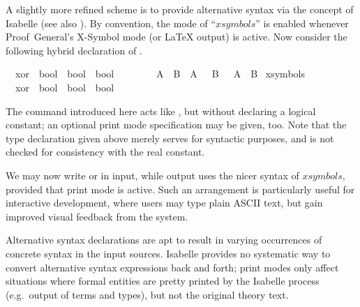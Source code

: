 \begin{isabellebody}
\begin{isamarkuptext}
  \medskip A slightly more refined scheme is to provide alternative
  syntax via the  concept of Isabelle (see also
  \cite{isabelle-ref}).  By convention, the mode of ``$xsymbols$'' is
  enabled whenever Proof~General's X-Symbol mode (or {\LaTeX} output)
  is active.  Now consider the following hybrid declaration of .%
\end{isamarkuptext}%
\isamarkuptrue%
\isamarkupfalse%
\isamarkupfalse%
\isanewline
\ \ xor\ {\isacharcolon}{\isacharcolon}\ {\isachardoublequote}bool\ {\isasymRightarrow}\ bool\ {\isasymRightarrow}\ bool{\isachardoublequote}\ \ \ \ {\isacharparenleft}\ {\isachardoublequote}{\isacharbrackleft}{\isacharplus}{\isacharbrackright}{\isasymignore}{\isachardoublequote}\ {}{}{\isacharparenright}\isanewline
\ \ {\isachardoublequote}A\ {\isacharbrackleft}{\isacharplus}{\isacharbrackright}{\isasymignore}\ B\ {\isasymequiv}\ {\isacharparenleft}A\ {\isasymand}\ {\isasymnot}\ B{\isacharparenright}\ {\isasymor}\ {\isacharparenleft}{\isasymnot}\ A\ {\isasymand}\ B{\isacharparenright}{\isachardoublequote}\isanewline
\isanewline
\isamarkupfalse%
\ {\isacharparenleft}xsymbols{\isacharparenright}\isanewline
\ \ xor\ {\isacharcolon}{\isacharcolon}\ {\isachardoublequote}bool\ {\isasymRightarrow}\ bool\ {\isasymRightarrow}\ bool{\isachardoublequote}\ \ \ \ {\isacharparenleft}\ {\isachardoublequote}{\isasymoplus}{\isasymignore}{\isachardoublequote}\ {}{}{\isacharparenright}\isamarkupfalse%
\isamarkupfalse%
%
\begin{isamarkuptext}%
The  command introduced here acts like
  , but without declaring a logical constant; an
  optional print mode specification may be given, too.  Note that the
  type declaration given above merely serves for syntactic purposes,
  and is not checked for consistency with the real constant.

  \medskip We may now write  or  in
  input, while output uses the nicer syntax of $xsymbols$, provided
  that print mode is active.  Such an arrangement is particularly
  useful for interactive development, where users may type plain ASCII
  text, but gain improved visual feedback from the system.

  \begin{warn}
  Alternative syntax declarations are apt to result in varying
  occurrences of concrete syntax in the input sources.  Isabelle
  provides no systematic way to convert alternative syntax expressions
  back and forth; print modes only affect situations where formal
  entities are pretty printed by the Isabelle process (e.g.\ output of
  terms and types), but not the original theory text.
  \end{warn}


\end{isamarkuptext}
\end{isabellebody}
